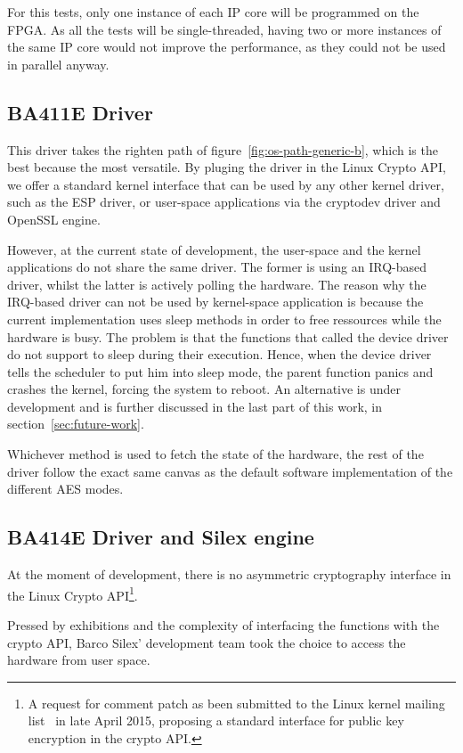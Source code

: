 For this tests, only one instance of each IP core will be programmed on the FPGA.
As all the tests will be single-threaded, having two or more instances of the same IP core would not improve the performance, as they could not be used in parallel anyway.

\subsection{BA411E Driver}\label{sec:implem-ba411e-driver}
This driver takes the righten path of figure~\ref{fig:os-path-generic-b}, which is the best because the most versatile.
By pluging the driver in the Linux Crypto API, we offer a standard kernel interface that can be used by any other kernel driver, such as the ESP driver, or user-space applications via the cryptodev driver and OpenSSL engine.

However, at the current state of development, the user-space and the kernel applications do not share the same driver.
The former is using an IRQ-based driver, whilst the latter is actively polling the hardware.
The reason why the IRQ-based driver can not be used by kernel-space application is because the current implementation uses sleep methods in order to free ressources while the hardware is busy.
The problem is that the functions that called the device driver do not support to sleep during their execution.
Hence, when the device driver tells the scheduler to put him into sleep mode, the parent function panics and crashes the kernel, forcing the system to reboot.
An alternative is under development and is further discussed in the last part of this work, in section~\ref{sec:future-work}. \newline{}

Whichever method is used to fetch the state of the hardware, the rest of the driver follow the exact same canvas as the default software implementation of the different AES modes.


\subsection{BA414E Driver and Silex engine}
At the moment of development, there is no asymmetric cryptography interface in the Linux Crypto API\footnote{A request for comment patch as been submitted to the Linux kernel mailing list~\cite{crypto-api-pk-encryption} in late April 2015, proposing a standard interface for public key encryption in the crypto API.}.

Pressed by exhibitions and the complexity of interfacing the functions with the crypto API, Barco Silex' development team took the choice to access the hardware from user space.

